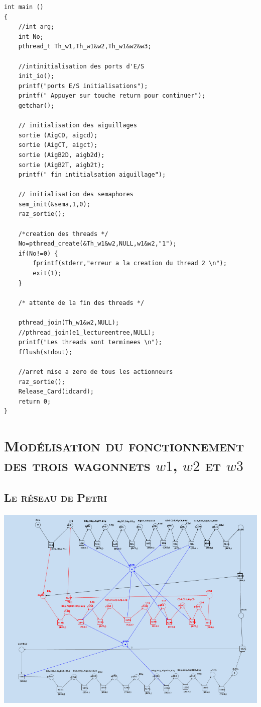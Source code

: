 \begin{lstlisting}
int main ()
{
	//int arg;
	int No;
	pthread_t Th_w1,Th_w1&w2,Th_w1&w2&w3;
	
	//intinitialisation des ports d'E/S
	init_io();
	printf("ports E/S initialisations");
	printf(" Appuyer sur touche return pour continuer");
	getchar();

	// initialisation des aiguillages
	sortie (AigCD, aigcd);
	sortie (AigCT, aigct);	
	sortie (AigB2D, aigb2d);
	sortie (AigB2T, aigb2t);
	printf(" fin intitialsation aiguillage");

	// initialisation des semaphores
	sem_init(&sema,1,0);
	raz_sortie();
	
	/*creation des threads */
	No=pthread_create(&Th_w1&w2,NULL,w1&w2,"1");
	if(No!=0) {
		fprintf(stderr,"erreur a la creation du thread 2 \n");
		exit(1);
	}

	/* attente de la fin des threads */
	
	pthread_join(Th_w1&w2,NULL);
	//pthread_join(e1_lectureentree,NULL);
	printf("Les threads sont terminees \n");
	fflush(stdout);
	
	//arret mise a zero de tous les actionneurs
	raz_sortie();
	Release_Card(idcard);
	return 0;
}
	\end{lstlisting}



\chapter{\textsc{ Modélisation du fonctionnement des trois wagonnets $w1$, $w2$ et $w3$}}
\section{\textsc{Le réseau de Petri}}
	
	\begin{center}
	\includegraphics[width=15cm, height=10cm]{w3.png}
	\label{fig3} 
	\end{center}  

